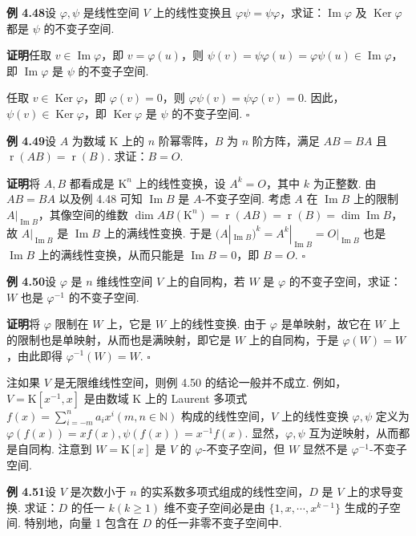 \documentclass[UTF8,12pt,a4paper,fontset=fandol]{ctexart}
\begin{document}
\noindent\textbf{例 4.48}\quad 设 $\varphi,\psi$ 是线性空间 $V$ 上的线性变换且 $\varphi\psi=\psi\varphi$，求证：$\operatorname{Im}\varphi$ 及 $\operatorname{Ker}\varphi$ 都是 $\psi$ 的不变子空间.

\noindent\textbf{证明}\quad 任取 $v\in\operatorname{Im}\varphi$，即 $v=\varphi(u)$，则 $\psi(v)=\psi\varphi(u)=\varphi\psi(u)\in\operatorname{Im}\varphi$，即 $\operatorname{Im}\varphi$ 是 $\psi$ 的不变子空间.

任取 $v\in\operatorname{Ker}\varphi$，即 $\varphi(v)=0$，则 $\varphi\psi(v)=\psi\varphi(v)=0$. 因此，$\psi(v)\in\operatorname{Ker}\varphi$，即 $\operatorname{Ker}\varphi$ 是 $\psi$ 的不变子空间. $\square$

\noindent\textbf{例 4.49}\quad 设 $A$ 为数域 $\mathrm{K}$ 上的 $n$ 阶幂零阵，$B$ 为 $n$ 阶方阵，满足 $AB=BA$ 且 $\operatorname{r}(AB)=\operatorname{r}(B)$. 求证：$B=O$.

\noindent\textbf{证明}\quad 将 $A,B$ 都看成是 $\mathrm{K}^n$ 上的线性变换，设 $A^k=O$，其中 $k$ 为正整数. 由 $AB=BA$ 以及例 4.48 可知 $\operatorname{Im}B$ 是 $A$-不变子空间. 考虑 $A$ 在 $\operatorname{Im}B$ 上的限制 $A|_{\operatorname{Im}B}$，其像空间的维数 $\dim AB(\mathrm{K}^n)=\operatorname{r}(AB)=\operatorname{r}(B)=\dim\operatorname{Im}B$，故 $A|_{\operatorname{Im}B}$ 是 $\operatorname{Im}B$ 上的满线性变换. 于是 $(A|_{\operatorname{Im}B})^k=A^k|_{\operatorname{Im}B}=O|_{\operatorname{Im}B}$ 也是 $\operatorname{Im}B$ 上的满线性变换，从而只能是 $\operatorname{Im}B=0$，即 $B=O$. $\square$

\noindent\textbf{例 4.50}\quad 设 $\varphi$ 是 $n$ 维线性空间 $V$ 上的自同构，若 $W$ 是 $\varphi$ 的不变子空间，求证：$W$ 也是 $\varphi^{-1}$ 的不变子空间.

\noindent\textbf{证明}\quad 将 $\varphi$ 限制在 $W$ 上，它是 $W$ 上的线性变换. 由于 $\varphi$ 是单映射，故它在 $W$ 上的限制也是单映射，从而也是满映射，即它是 $W$ 上的自同构，于是 $\varphi(W)=W$，由此即得 $\varphi^{-1}(W)=W$. $\square$

注\quad 如果 $V$ 是无限维线性空间，则例 4.50 的结论一般并不成立. 例如，$V=\mathrm{K}[x^{-1},x]$ 是由数域 $\mathrm{K}$ 上的 Laurent 多项式 $f(x)=\sum_{i=-m}^n a_ix^i(m,n\in\mathbb{N})$ 构成的线性空间，$V$ 上的线性变换 $\varphi,\psi$ 定义为 $\varphi(f(x))=xf(x),\psi(f(x))=x^{-1}f(x)$. 显然，$\varphi,\psi$ 互为逆映射，从而都是自同构. 注意到 $W=\mathrm{K}[x]$ 是 $V$ 的 $\varphi$-不变子空间，但 $W$ 显然不是 $\varphi^{-1}$-不变子空间.

\noindent\textbf{例 4.51}\quad 设 $V$ 是次数小于 $n$ 的实系数多项式组成的线性空间，$D$ 是 $V$ 上的求导变换. 求证：$D$ 的任一 $k(k\ge1)$ 维不变子空间必是由 $\{1,x,\cdots,x^{k-1}\}$ 生成的子空间. 特别地，向量 1 包含在 $D$ 的任一非零不变子空间中.
\end{document}
